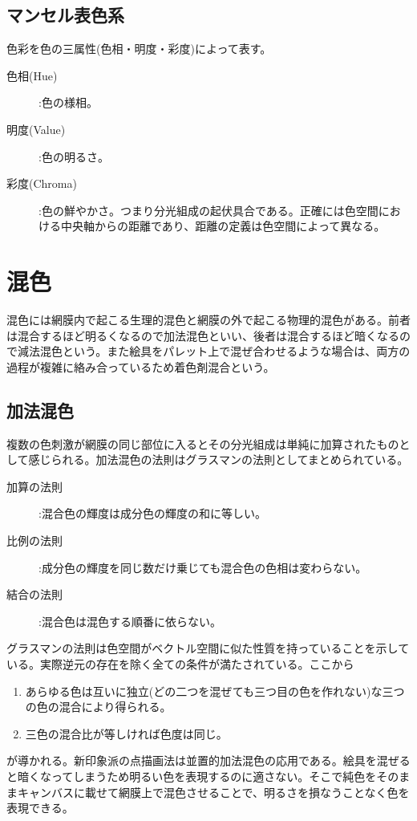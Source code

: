 		\subsection{マンセル表色系}
			色彩を色の三属性(色相・明度・彩度)によって表す。
			\begin{description}
				\item[色相(Hue)]:色の様相。
				\item[明度(Value)]:色の明るさ。
				\item[彩度(Chroma)]:色の鮮やかさ。つまり分光組成の起伏具合である。正確には色空間における中央軸からの距離であり、距離の定義は色空間によって異なる。
			\end{description}
	\section{混色}
		混色には網膜内で起こる生理的混色と網膜の外で起こる物理的混色がある。前者は混合するほど明るくなるので加法混色といい、後者は混合するほど暗くなるので減法混色という。また絵具をパレット上で混ぜ合わせるような場合は、両方の過程が複雑に絡み合っているため着色剤混合という。
		\subsection{加法混色}
			複数の色刺激が網膜の同じ部位に入るとその分光組成は単純に加算されたものとして感じられる。加法混色の法則はグラスマンの法則としてまとめられている。
			\begin{description}
				\item[加算の法則]:混合色の輝度は成分色の輝度の和に等しい。
				\item[比例の法則]:成分色の輝度を同じ数だけ乗じても混合色の色相は変わらない。
				\item[結合の法則]:混合色は混色する順番に依らない。
			\end{description}
			グラスマンの法則は色空間がベクトル空間に似た性質を持っていることを示している。実際逆元の存在を除く全ての条件が満たされている。ここから
			\begin{enumerate}
				\item あらゆる色は互いに独立(どの二つを混ぜても三つ目の色を作れない)な三つの色の混合により得られる。
				\item 三色の混合比が等しければ色度は同じ。
			\end{enumerate}
			が導かれる。新印象派の点描画法は並置的加法混色の応用である。絵具を混ぜると暗くなってしまうため明るい色を表現するのに適さない。そこで純色をそのままキャンバスに載せて網膜上で混色させることで、明るさを損なうことなく色を表現できる。
